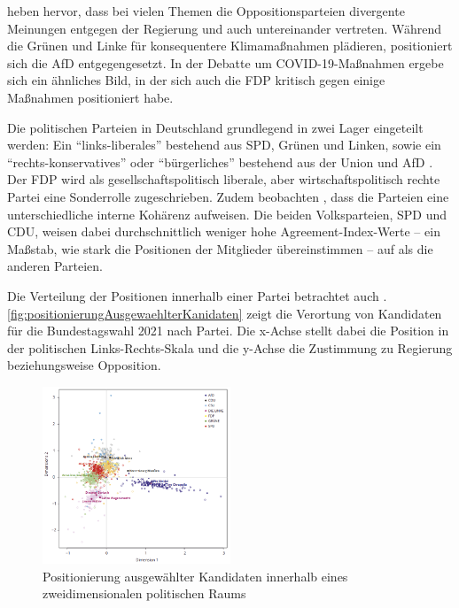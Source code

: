 \textcite{engler_wettbewerb_2022} heben hervor, dass bei vielen Themen die Oppositionsparteien divergente Meinungen entgegen der Regierung und auch untereinander vertreten. Während die Grünen und Linke für konsequentere Klimamaßnahmen plädieren, positioniert sich die \ac{AfD} entgegengesetzt. In der Debatte um \ac{COVID-19}-Maßnahmen ergebe sich ein ähnliches Bild, in der sich auch die \ac{FDP} kritisch gegen einige Maßnahmen positioniert habe.

Die politischen Parteien in Deutschland grundlegend in zwei Lager eingeteilt werden: Ein \enquote{links-liberales} bestehend aus \ac{SPD}, Grünen und Linken, sowie ein \enquote{rechts-konservatives} oder \enquote{bürgerliches} bestehend aus der Union und \ac{AfD} \autocite{thomeczek_politische_2019}. Der \ac{FDP} wird als gesellschaftspolitisch liberale, aber wirtschaftspolitisch rechte Partei eine Sonderrolle zugeschrieben. Zudem beobachten \textcite{thomeczek_politische_2019}, dass die Parteien eine unterschiedliche interne Kohärenz aufweisen. Die beiden Volksparteien, \ac{SPD} und \ac{CDU}, weisen dabei durchschnittlich weniger hohe Agreement-Index-Werte -- ein Maßstab, wie stark die Positionen der Mitglieder übereinstimmen -- auf als die anderen Parteien.

Die Verteilung der Positionen innerhalb einer Partei betrachtet auch \textcite{saltzer_bundestagswahl_2022}. \autoref{fig:positionierungAusgewaehlterKanidaten} zeigt die Verortung von Kandidaten für die Bundestagswahl \num{2021} nach Partei. Die x-Achse stellt dabei die Position in der politischen Links-Rechts-Skala und die y-Achse die Zustimmung zu Regierung beziehungsweise Opposition.

\begin{figure}[H]
    \centering
    \includegraphics[width=0.5\textwidth]{data/images/positionierung_ausgewaehlter_kandidaten.png}
    \caption[Positionierung ausgewählter Kandidaten \autocite{saltzer_bundestagswahl_2022}]{Positionierung ausgewählter Kandidaten innerhalb eines zweidimensionalen politischen Raums \autocite{saltzer_bundestagswahl_2022}} \label{fig:positionierungAusgewaehlterKanidaten}
\end{figure}


